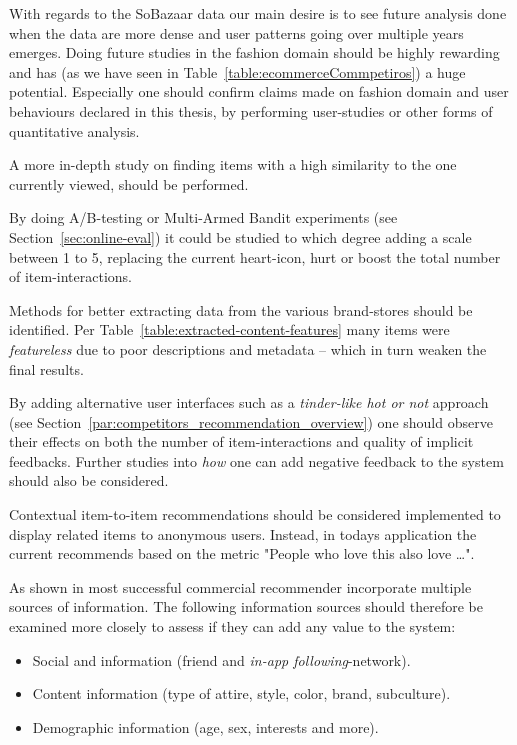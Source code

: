 With regards to the SoBazaar data our main desire is to see future analysis
done when the data are more dense and user patterns going over multiple years
emerges. Doing future studies in the fashion domain should be highly rewarding
and has (as we have seen in Table~\ref{table:ecommerceCommpetiros}) a huge
potential. Especially one should confirm claims made on fashion domain and user
behaviours declared in this thesis, by performing user-studies or other forms
of quantitative analysis.

A more in-depth study on finding items with a high similarity to the one
currently viewed, should be performed.

By doing A/B-testing or Multi-Armed Bandit experiments (see
Section~\ref{sec:online-eval}) it could be studied to which degree adding a
scale between 1 to 5, replacing the current heart-icon, hurt or boost the total
number of item-interactions.

Methods for better extracting data from the various brand-stores should be
identified. Per Table~\ref{table:extracted-content-features} many items were
\textit{featureless} due to poor descriptions and metadata -- which in turn
weaken the final results.

By adding alternative user interfaces such as a \textit{tinder-like hot or not}
approach (see Section~\ref{par:competitors_recommendation_overview}) one should
observe their effects on both the number of item-interactions and quality of
implicit feedbacks. Further studies into \textit{how} one can add negative
feedback to the system should also be considered.

Contextual item-to-item recommendations should be considered implemented to
display related items to anonymous users. Instead, in todays application the
current recommends based on the metric "People who love this also love \dots".

As shown in \cite{meyer2012recommender} most successful commercial recommender
incorporate multiple sources of information. The following information sources
should therefore be examined more closely to assess if they can add any value
to the system:

\begin{itemize}
	\item Social and information (friend and \textit{in-app following}-network).
	\item Content information (type of attire, style, color, brand, subculture).
	\item Demographic information (age, sex, interests and more).
\end{itemize}


